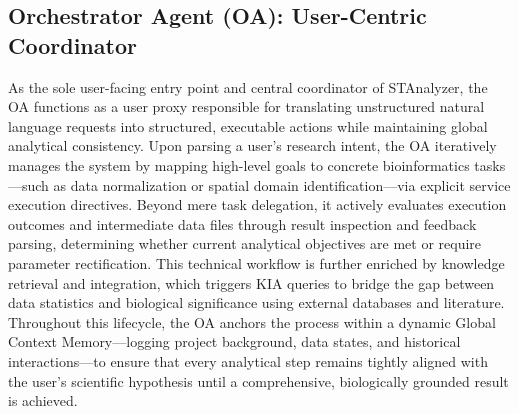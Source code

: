 \documentclass[11pt,a4paper]{article}
\begin{document}
\subsection{Orchestrator Agent (OA): User-Centric Coordinator}
As the sole user-facing entry point and central coordinator of STAnalyzer, the OA functions as a user proxy responsible for translating unstructured natural language requests into structured, executable actions while maintaining global analytical consistency. Upon parsing a user’s research intent, the OA iteratively manages the system by mapping high-level goals to concrete bioinformatics tasks—such as data normalization or spatial domain identification—via explicit service execution directives. Beyond mere task delegation, it actively evaluates execution outcomes and intermediate data files through result inspection and feedback parsing, determining whether current analytical objectives are met or require parameter rectification. This technical workflow is further enriched by knowledge retrieval and integration, which triggers KIA queries to bridge the gap between data statistics and biological significance using external databases and literature. Throughout this lifecycle, the OA anchors the process within a dynamic Global Context Memory—logging project background, data states, and historical interactions—to ensure that every analytical step remains tightly aligned with the user’s scientific hypothesis until a comprehensive, biologically grounded result is achieved.

    
\end{document}
